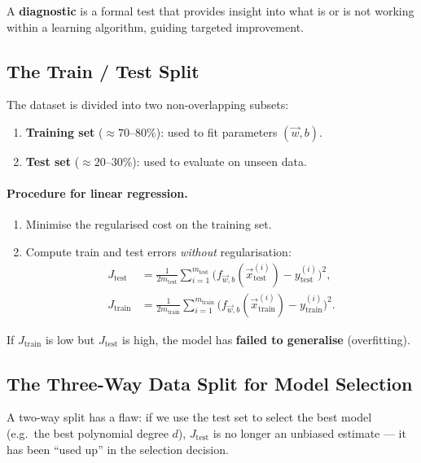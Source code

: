 \begin{definition}[Diagnostic]
A \textbf{diagnostic} is a formal test that provides insight into what is
or is not working within a learning algorithm, guiding targeted improvement.
\end{definition}

\subsection{The Train / Test Split}

The dataset is divided into two non-overlapping subsets:
\begin{enumerate}
\item \textbf{Training set} ($\approx70$--$80\%$): used to fit parameters $(\vec{w},b)$.
\item \textbf{Test set} ($\approx20$--$30\%$): used to evaluate on unseen data.
\end{enumerate}

\paragraph{Procedure for linear regression.}
\begin{enumerate}
\item Minimise the regularised cost on the training set.
\item Compute train and test errors \emph{without} regularisation:
\begin{align}
J_{\text{test}}&=\frac{1}{2m_{\text{test}}}\sum_{i=1}^{m_{\text{test}}}
\bigl(f_{\vec{w},b}(\vec{x}_{\text{test}}^{(i)})-y_{\text{test}}^{(i)}\bigr)^2,\\
J_{\text{train}}&=\frac{1}{2m_{\text{train}}}\sum_{i=1}^{m_{\text{train}}}
\bigl(f_{\vec{w},b}(\vec{x}_{\text{train}}^{(i)})-y_{\text{train}}^{(i)}\bigr)^2.
\end{align}
\end{enumerate}

\begin{remark}
If $J_{\text{train}}$ is low but $J_{\text{test}}$ is high, the model has
\textbf{failed to generalise} (overfitting).
\end{remark}

\subsection{The Three-Way Data Split for Model Selection}

A two-way split has a flaw: if we use the test set to select the best model
(e.g.\ the best polynomial degree $d$), $J_{\text{test}}$ is no longer an
unbiased estimate — it has been ``used up'' in the selection decision.

